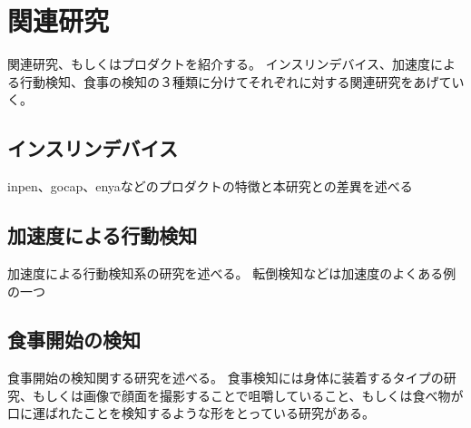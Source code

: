 \chapter{関連研究}
\label{chap:related_works}

関連研究、もしくはプロダクトを紹介する。
インスリンデバイス、加速度による行動検知、食事の検知の３種類に分けてそれぞれに対する関連研究をあげていく。

\section{インスリンデバイス}

inpen、gocap、enyaなどのプロダクトの特徴と本研究との差異を述べる

\section{加速度による行動検知}

加速度による行動検知系の研究を述べる。
転倒検知などは加速度のよくある例の一つ

\section{食事開始の検知}

食事開始の検知関する研究を述べる。
食事検知には身体に装着するタイプの研究、もしくは画像で顔面を撮影することで咀嚼していること、もしくは食べ物が口に運ばれたことを検知するような形をとっている研究がある。
